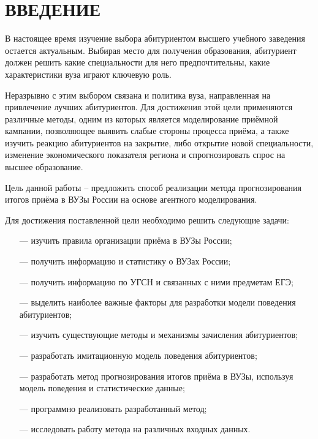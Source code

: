 \section*{ВВЕДЕНИЕ}

В настоящее время изучение выбора абитуриентом высшего учебного заведения остается актуальным. Выбирая место для получения образования, абитуриент должен решить какие специальности для него предпочтительны, какие характеристики вуза играют ключевую роль.

Неразрывно с этим выбором связана и политика вуза, направленная на привлечение лучших абитуриентов. Для достижения этой цели применяются различные методы, одним из которых является моделирование приёмной кампании, позволяющее выявить слабые стороны процесса приёма, а также
изучить реакцию абитуриентов на закрытие, либо открытие новой специальности, изменение экономического показателя региона и спрогнозировать спрос на высшее образование. 

Цель данной работы – предложить способ реализации метода прогнозирования итогов приёма в ВУЗы России на основе агентного моделирования.

Для достижения поставленной цели необходимо решить следующие задачи:

\begin{itemize}[leftmargin=1.6\parindent]
	\item[---] изучить правила организации приёма в ВУЗы России;
	\item[---] получить информацию и статистику о ВУЗах России;
	\item[---] получить информацию по УГСН и связанных с ними предметам ЕГЭ;
	\item[---] выделить наиболее важные факторы для разработки модели поведения абитуриентов;
	\item[---] изучить существующие методы и механизмы зачисления абитуриентов;
	\item[---] разработать имитационную модель поведения абитуриентов;
	\item[---] разработать метод прогнозирования итогов приёма в ВУЗы, используя модель поведения и статистические данные;
	\item[---] программно реализовать разработанный метод;
	\item[---] исследовать работу метода на различных входных данных.
\end{itemize}


\pagebreak